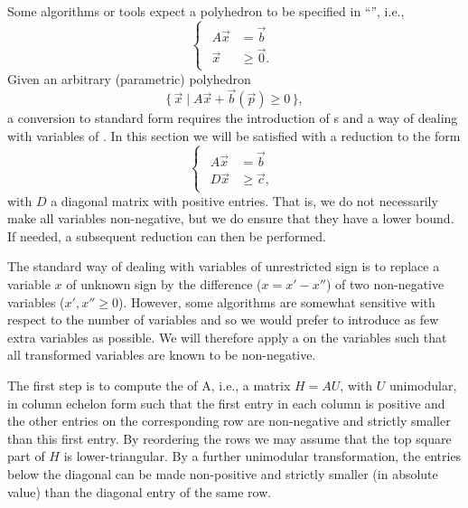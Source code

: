 Some algorithms or tools expect a polyhedron to be
specified in ``'', i.e.,
\begin{equation}
\label{eq:standard}
\begin{cases}
    \begin{aligned}
A \vec x & = \vec b \\
\vec x & \ge \vec 0
.
    \end{aligned}
\end{cases}
\end{equation}
Given an arbitrary (parametric) polyhedron
\begin{equation}
\label{eq:non-standard}
\{\,
\vec x \mid
A \vec x + \vec b(\vec p) \ge 0
\,\}
,
\end{equation}
a conversion to standard form requires the introduction
of s and a way of dealing with variables
of .
In this section we will be satisfied with a reduction
to the form
\begin{equation}
\label{eq:standard:2}
\begin{cases}
    \begin{aligned}
A \vec x & = \vec b \\
D \vec x & \ge \vec c
,
    \end{aligned}
\end{cases}
\end{equation}
with $D$ a diagonal matrix with positive entries.
That is, we do not necessarily make all variables non-negative,
but we do ensure that they have a lower bound.
If needed, a subsequent reduction can then be performed.

The standard way of dealing with variables of unrestricted
sign is to replace a variable $x$ of unknown sign by the
difference ($x = x' - x''$) of two non-negative variables
($x', x'' \ge 0$).
However, some algorithms are somewhat sensitive with respect
to the number of variables and so we would prefer to introduce
as few extra variables as possible.
We will therefore apply a 
on the variables such that all transformed variables are known
to be non-negative.

The first step is to compute the  of A,
i.e., a matrix $H = A U$, with $U$ unimodular,
in column echelon form such that the
first entry in each column is positive and the other entries
on the corresponding row are non-negative and strictly smaller
than this first entry.
By reordering the rows we may assume that the top square part
of $H$ is lower-triangular.
By a further unimodular transformation, the entries
below the diagonal can be made non-positive and strictly
smaller (in absolute value) than the diagonal entry of the same row.


